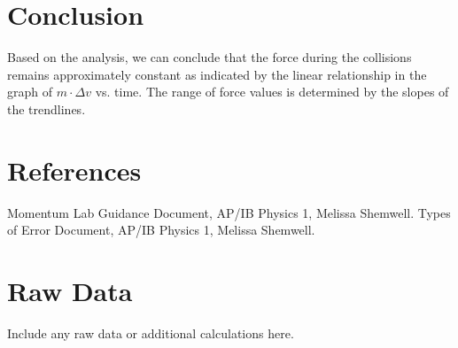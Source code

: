\documentclass[12pt]{article}
\begin{document}
\section{Conclusion}
Based on the analysis, we can conclude that the force during the collisions remains approximately constant as indicated by the linear relationship in the graph of $m \cdot \Delta v$ vs. time. The range of force values is determined by the slopes of the trendlines.

\section{References}
\begin{thebibliography}{9}
Momentum Lab Guidance Document, AP/IB Physics 1, Melissa Shemwell.
Types of Error Document, AP/IB Physics 1, Melissa Shemwell.
\end{thebibliography}

\appendix  
\clearpage
\addappheadtotoc 
\appendixpage 

\section{Raw Data}
Include any raw data or additional calculations here.
\end{document}
